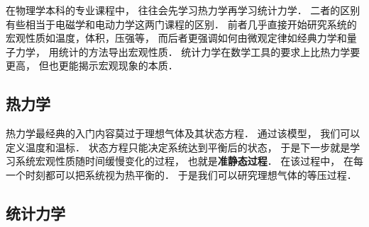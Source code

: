 
在物理学本科的专业课程中， 往往会先学习热力学再学习统计力学． 二者的区别有些相当于电磁学和电动力学这两门课程的区别． 前者几乎直接开始研究系统的宏观性质如温度，体积，压强等， 而后者更强调如何由微观定律如经典力学和量子力学， 用统计的方法导出宏观性质． 统计力学在数学工具的要求上比热力学要更高， 但也更能揭示宏观现象的本质．

\subsection{热力学}
热力学最经典的入门内容莫过于理想气体及其状态方程． 通过该模型， 我们可以定义温度和温标． 状态方程只能决定系统达到平衡后的状态， 于是下一步就是学习系统宏观性质随时间缓慢变化的过程， 也就是\textbf{准静态过程}． 在该过程中， 在每一个时刻都可以把系统视为热平衡的． 于是我们可以研究理想气体的等压过程．

\subsection{统计力学}
